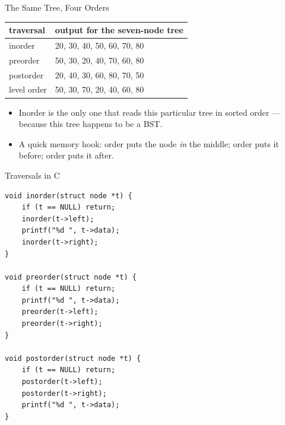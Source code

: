 \documentclass[aspectratio=169]{beamer}
\begin{document}
\begin{frame}{The Same Tree, Four Orders}
  \begin{center}
  {\footnotesize
  \begin{tabular}{l l}
    \toprule
    \textbf{traversal} & \textbf{output for the seven-node tree} \\
    \midrule
    inorder   & 20, 30, 40, 50, 60, 70, 80 \\
    preorder  & 50, 30, 20, 40, 70, 60, 80 \\
    postorder & 20, 40, 30, 60, 80, 70, 50 \\
    level order & 50, 30, 70, 20, 40, 60, 80 \\
    \bottomrule
  \end{tabular}}
  \end{center}
  \begin{itemize}
    \item Inorder is the only one that reads this particular tree in sorted
      order --- because this tree happens to be a BST.
    \item A quick memory hook: order puts the node \emph{in} the
      middle; order puts it before; order puts it after.
  \end{itemize}
\end{frame}

\begin{frame}[fragile]{Traversals in C}
  \scriptsize
\begin{verbatim}
void inorder(struct node *t) {
    if (t == NULL) return;
    inorder(t->left);
    printf("%d ", t->data);
    inorder(t->right);
}

void preorder(struct node *t) {
    if (t == NULL) return;
    printf("%d ", t->data);
    preorder(t->left);
    preorder(t->right);
}

void postorder(struct node *t) {
    if (t == NULL) return;
    postorder(t->left);
    postorder(t->right);
    printf("%d ", t->data);
}
\end{verbatim}
  \vspace{-0.15cm}
  \footnotesize
\end{frame}
\end{document}
